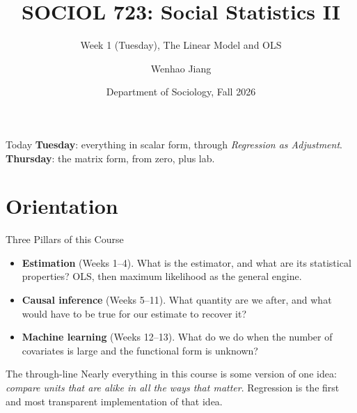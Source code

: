 \documentclass[aspectratio=169,11pt,xcolor=dvipsnames]{beamer}
\title[SOCIOL 723]{SOCIOL 723: Social Statistics II\\[-2pt]}
\subtitle{Week 1 (Tuesday), The Linear Model and OLS\\[-6pt]}
\author[Jiang]{Wenhao Jiang\vspace{-2.5em}}
\institute[Duke]{}
\date{Department of Sociology, Fall 2026}
\begin{document}
\begin{frame}[plain]
  \titlepage
\end{frame}

\begin{frame}{Today}
  \tableofcontents
  \vskip6pt
  {\footnotesize \textbf{Tuesday}: everything in scalar form, through
  \emph{Regression as Adjustment}. \quad \textbf{Thursday}: the matrix form,
  from zero, plus lab.}
\end{frame}

\section[Orientation]{Orientation}
\begin{frame}\sectionpage\end{frame}

\begin{frame}{Three Pillars of this Course}
\begin{itemize}\itemsep6pt
  \item \textbf{Estimation} (Weeks 1--4). What is the estimator, and what are its
        statistical properties? OLS, then maximum likelihood as the general engine.
  \item \textbf{Causal inference} (Weeks 5--11). What quantity are we after, and
        what would have to be true for our estimate to recover it?
  \item \textbf{Machine learning} (Weeks 12--13). What do we do when the number of
        covariates is large and the functional form is unknown?
\end{itemize}
\vskip8pt
\begin{block}{The through-line}
Nearly everything in this course is some version of one idea:
\emph{compare units that are alike in all the ways that matter}. Regression is the
first and most transparent implementation of that idea.
\end{block}
\end{frame}
\end{document}
